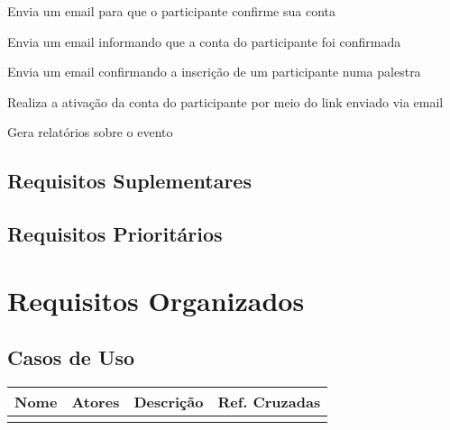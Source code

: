 \documentclass[12pt,a4paper]{article}
\begin{document}
        	{Envia um email para que o participante confirme sua conta}
        	{%
        	
        	}
			
        	{Envia um email informando que a conta do participante foi confirmada}
        	{%
        	
        	}

			\FloatBarrier
        	{Envia um email confirmando a inscrição de um participante numa palestra}
        	{%
        	
        	}
			
        	{Realiza a ativação da conta do participante por meio do link enviado via email}
        	{%
        	
        	}

        	{Gera relatórios sobre o evento}
        	{%
        	
        	}

        	\clearpage
        	\subsection{Requisitos Suplementares}
        	
        	\subsection{Requisitos Prioritários}
        	
        	\newpage
        	\section{Requisitos Organizados}
	        	\subsection{Casos de Uso}
	        	
	        		\begin{tabular}{|l|l|l|l|}
	        		\hline Nome & Atores & Descrição & Ref. Cruzadas \\ 
	        		\hline  &  &  &  \\ 
	        		\hline 
	        		\end{tabular} 
	        		
\end{document}
